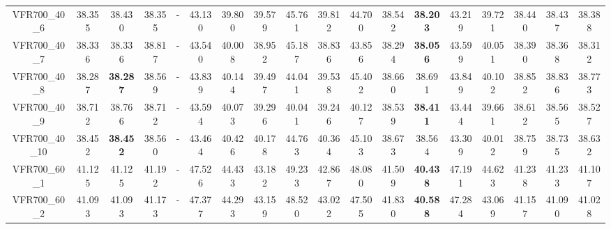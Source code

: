 \begin{tabular}{cc|ccc|ccccccccccccc}
VFR700\_40\_6      & 38.355           & 38.430           & 38.355           & -                & 43.130           & 39.800           & 39.579           & 45.761           & 39.812           & 44.700           & 38.542           & {\bf 38.203}     & 43.219           & 39.721           & 38.440           & 38.437           & 38.388          \\ 
VFR700\_40\_7      & 38.336           & 38.336           & 38.817           & -                & 43.540           & 40.008           & 38.952           & 45.187           & 38.836           & 43.856           & 38.294           & {\bf 38.056}     & 43.599           & 40.051           & 38.390           & 38.368           & 38.312          \\ 
VFR700\_40\_8      & 38.287           & {\bf 38.287}     & 38.569           & -                & 43.839           & 40.144           & 39.497           & 44.041           & 39.538           & 45.402           & 38.660           & 38.691           & 43.849           & 40.102           & 38.852           & 38.836           & 38.773          \\ 
VFR700\_40\_9      & 38.712           & 38.766           & 38.712           & -                & 43.594           & 40.073           & 39.296           & 40.041           & 39.246           & 40.127           & 38.539           & {\bf 38.411}     & 43.444           & 39.661           & 38.612           & 38.565           & 38.527          \\ 
VFR700\_40\_10     & 38.452           & {\bf 38.452}     & 38.560           & -                & 43.464           & 40.426           & 40.178           & 44.763           & 40.364           & 45.103           & 38.673           & 38.564           & 43.309           & 40.012           & 38.759           & 38.735           & 38.632          \\ 
VFR700\_60\_1      & 41.125           & 41.125           & 41.192           & -                & 47.526           & 44.433           & 43.182           & 49.233           & 42.867           & 48.080           & 41.509           & {\bf 40.438}     & 47.191           & 44.623           & 41.238           & 41.233           & 41.107          \\ 
VFR700\_60\_2      & 41.093           & 41.093           & 41.173           & -                & 47.377           & 44.293           & 43.159           & 48.520           & 43.022           & 47.505           & 41.830           & {\bf 40.588}     & 47.284           & 43.069           & 41.157           & 41.090           & 41.028          \\ 

\end{tabular}
